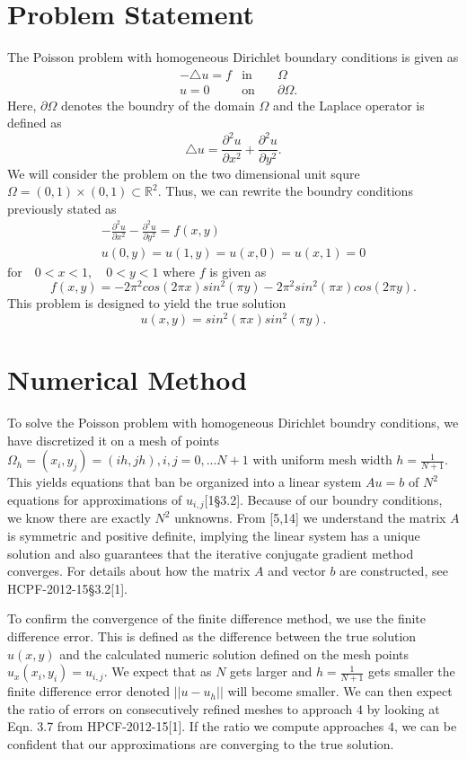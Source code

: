 \documentclass[11pt]{article}
\begin{document}
\section{Problem Statement}
The Poisson problem with homogeneous Dirichlet boundary conditions is given as
\begin{align*}
&-\triangle u=f &\text{in}\hspace{1em}& \Omega\\
&u=0            &\text{on}\hspace{1em}& \partial\Omega.
\end{align*}
Here, $\partial\Omega$ denotes the boundry of the domain $\Omega$ and the Laplace operator is defined as
$$\triangle u=\frac{\partial ^2 u}{\partial x^2}+\frac{\partial ^2 u}{\partial y^2}.$$
We will consider the problem on the two dimensional unit squre $\Omega=(0,1)\times (0,1)\subset \mathbb{R}^2$. Thus, we can rewrite the boundry conditions previously stated as
\begin{align*}
&-\frac{\partial ^2 u}{\partial x^2}-\frac{\partial ^2 u}{\partial y^2}=f(x,y)&\\
&u(0,y)=u(1,y)=u(x,0)=u(x,1)=0 &
\end{align*}
$\text{for}\hspace{1em} 0<x<1,\hspace{1em} 0<y<1$ where $f$ is given as
$$f(x,y)=-2\pi ^2 cos(2\pi x)sin^2 (\pi y)-2\pi ^2 sin^2(\pi x)cos(2\pi y).$$
This problem is designed to yield the true solution
$$u(x,y)=sin^2 (\pi x)sin^2 (\pi y).$$
\section{Numerical Method}
To solve the Poisson problem with homogeneous Dirichlet boundry conditions, we have discretized it on a mesh of points $\Omega_h ={(x_i, y_j)=(ih,jh),i,j=0,...N+1}$ with uniform mesh width $h=\frac{1}{N+1}$. This yields equations that ban be organized into a linear system $Au=b$ of $N^2$ equations for approximations of $u_{i,j}$[1\S 3.2]. Because of our boundry conditions, we know there are exactly $N^2$ unknowns. From [5,14] we understand the matrix $A$ is symmetric and positive definite, implying the linear system has a unique solution and also guarantees that the iterative conjugate gradient method converges. For details about how the matrix $A$ and vector $b$ are constructed, see HCPF-2012-15\S3.2[1].

To confirm the convergence of the finite difference method, we use the finite difference error. This is defined as the difference between the true solution $u(x,y)$ and the calculated numeric solution defined on the mesh points $u_x(x_i,y_i)=u_{i,j}$. We expect that as $N$ gets larger and $h=\frac{1}{N+1}$ gets smaller the finite difference error denoted $||u-u_h||$ will become smaller. We can then expect the ratio of errors on consecutively refined meshes to approach $4$ by looking at Eqn. 3.7 from HPCF-2012-15[1]. If the ratio we compute approaches $4$, we can be confident that our approximations are converging to the true solution.
\end{document}
